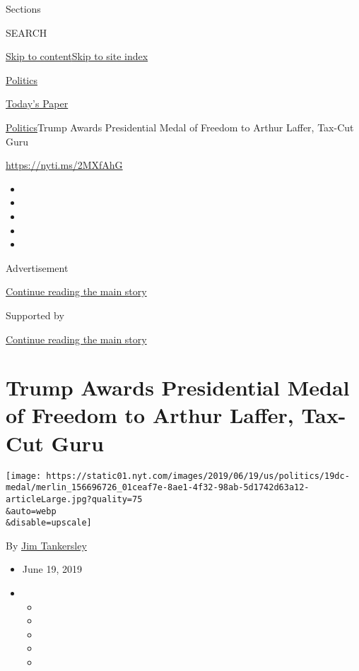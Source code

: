 Sections

SEARCH

\protect\hyperlink{site-content}{Skip to
content}\protect\hyperlink{site-index}{Skip to site index}

\href{https://www.nytimes.com/section/politics}{Politics}

\href{https://myaccount.nytimes.com/auth/login?response_type=cookie\&client_id=vi}{}

\href{https://www.nytimes.com/section/todayspaper}{Today's Paper}

\href{/section/politics}{Politics}\textbar{}Trump Awards Presidential
Medal of Freedom to Arthur Laffer, Tax-Cut Guru

\url{https://nyti.ms/2MXfAhG}

\begin{itemize}
\item
\item
\item
\item
\item
\end{itemize}

Advertisement

\protect\hyperlink{after-top}{Continue reading the main story}

Supported by

\protect\hyperlink{after-sponsor}{Continue reading the main story}

\hypertarget{trump-awards-presidential-medal-of-freedom-to-arthur-laffer-tax-cut-guru}{%
\section{Trump Awards Presidential Medal of Freedom to Arthur Laffer,
Tax-Cut
Guru}\label{trump-awards-presidential-medal-of-freedom-to-arthur-laffer-tax-cut-guru}}

\texttt{[image: https://static01.nyt.com/images/2019/06/19/us/politics/19dc-medal/merlin\_156696726\_01ceaf7e-8ae1-4f32-98ab-5d1742d63a12-articleLarge.jpg?quality=75\\\&auto=webp\\\&disable=upscale]}

By \href{https://www.nytimes.com/by/jim-tankersley}{Jim Tankersley}

\begin{itemize}
\item
  June 19, 2019
\item
  \begin{itemize}
  \item
  \item
  \item
  \item
  \item
  \end{itemize}
\end{itemize}

